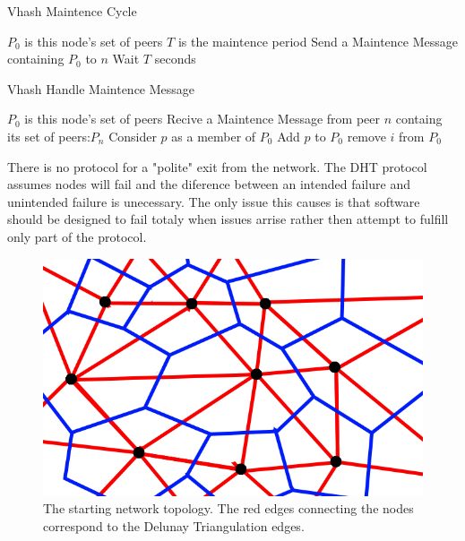 \documentclass[11pt]{IEEEtran} %
\begin{document}
\begin{algorithm}
\caption{Vhash Maintence Cycle}
\label{maint}
\begin{algorithmic}[1]  %
	\STATE $P_0$ is this node's set of peers
    \STATE $T$ is the maintence period
        	\STATE Send a Maintence Message containing $P_0$ to $n$
        \ENDFOR
    \STATE Wait $T$ seconds
    \ENDWHILE
\end{algorithmic}
\end{algorithm}


\begin{algorithm}
\caption{Vhash Handle Maintence Message}
\label{handlemaint}
\begin{algorithmic}[1]  %
	\STATE $P_0$ is this node's set of peers
	\STATE Recive a Maintence Message from peer $n$ containg its set of peers:$P_n$
    	\STATE Consider $p$ as a member of $P_0$
        	\STATE Add $p$ to $P_0$
                	\STATE remove $i$ from $P_0$
                \ENDIF
            \ENDFOR
        \ENDIF
    \ENDFOR
\end{algorithmic}
\end{algorithm}




There is no protocol for a "polite" exit from the network. The DHT protocol assumes nodes will fail and the diference between an intended failure and unintended failure is unecessary. The only issue this causes is that software should be designed to fail totaly when issues arrise rather then attempt to fulfill only part of the protocol.  



\begin{figure}
    \includegraphics[width=\linewidth]{voronoi-churn2}
    \caption{The starting network topology. The red edges connecting the nodes correspond to the Delunay Triangulation edges.}
    \label{churninit}
\end{figure}
\end{document}
